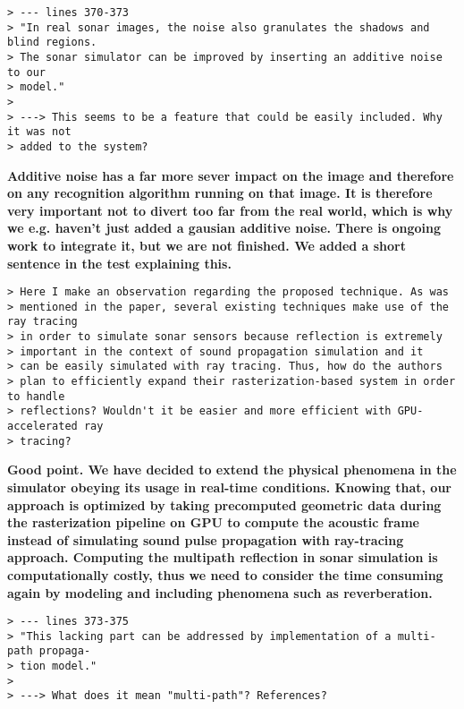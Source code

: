 \documentclass{article}
\begin{document}

\begin{verbatim}
> --- lines 370-373
> "In real sonar images, the noise also granulates the shadows and blind regions.
> The sonar simulator can be improved by inserting an additive noise to our
> model."
>
> ---> This seems to be a feature that could be easily included. Why it was not
> added to the system?

\end{verbatim}

\textbf{Additive noise has a far more sever impact on the image and therefore on any recognition 
algorithm running on that image. It is therefore very important not to divert too far from the real world, 
which is why we e.g. haven't just added a gausian additive noise. There is ongoing work to integrate it, 
but we are not finished. We added a short sentence in the test explaining this.}

\begin{verbatim}
> Here I make an observation regarding the proposed technique. As was
> mentioned in the paper, several existing techniques make use of the ray tracing
> in order to simulate sonar sensors because reflection is extremely
> important in the context of sound propagation simulation and it
> can be easily simulated with ray tracing. Thus, how do the authors
> plan to efficiently expand their rasterization-based system in order to handle
> reflections? Wouldn't it be easier and more efficient with GPU-accelerated ray
> tracing?
\end{verbatim}

\textbf{Good point. We have decided to extend the physical phenomena in the
simulator obeying its usage in real-time conditions. Knowing that, our approach
is optimized by taking precomputed geometric data during the rasterization
pipeline on GPU to compute the acoustic frame instead of simulating sound pulse propagation
with ray-tracing approach. Computing the multipath reflection in sonar simulation
is computationally costly, thus we need to consider the time consuming again by modeling
and including phenomena such as reverberation.}

\begin{verbatim}
> --- lines 373-375
> "This lacking part can be addressed by implementation of a multi-path propaga-
> tion model."
>
> ---> What does it mean "multi-path"? References?
\end{verbatim}
\end{document}
